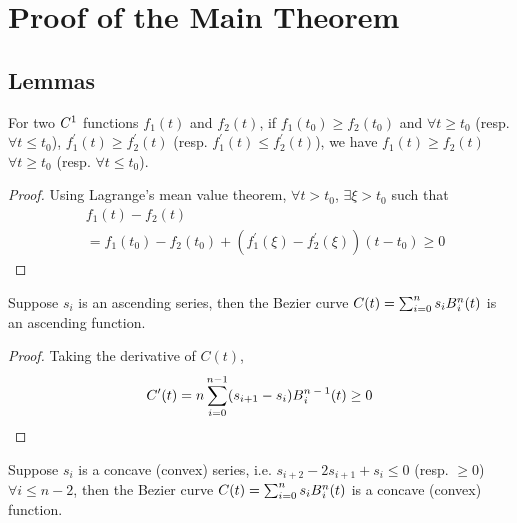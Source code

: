 \section{Proof of the Main Theorem} \label{Proof}

\subsection{Lemmas}

\begin{lemma}
For two $C\textsupsub{$1$}{}$ functions $f_{1}(t)$ and $f_{2}(t)$, if  $f_{1}(t_{0}) \geq f_{2}(t_{0})$ and $\forall t \geq t_{0}$ (resp. $\forall t \leq t_{0}$), 
$f_{1}^{\prime}(t) \geq f_{2}^{\prime}(t)$ (resp. $f_{1}^{\prime}(t) \leq f_{2}^{\prime}(t)$), we have $f_{1}(t) \geq f_{2}(t)$ $\forall t \geq t_{0}$ (resp. $\forall t \leq t_{0}$).
\label{lemma:simpleAscending}
\end{lemma}

\begin{proof}
Using Lagrange’s mean value theorem, $\forall t > t_{0}$,
$\exists \xi > t_{0}$ such that
\begin{equation}\begin{split}
&f_{1}(t)-f_{2}(t) \\
&=f_{1}(t_{0})-f_{2}(t_{0}) + (f_{1}^{\prime}(\xi)-f_{2}^{\prime}(\xi))(t-t_{0}) \ge 0
\label{eq.1}
\end{split}\end{equation}%
\end{proof}

\begin{lemma}
Suppose $s_{i}$ is an ascending series, then the Bezier curve $C(t)=\sum_{i=0}^{n}s_{i}B\textsupsub{$n$}{$i$}(t)$ is an ascending function.
\label{lemma:bezierAscending}
\end{lemma}

\begin{proof}
Taking the derivative of $C(t)$,
\begin{equation}\begin{split}
C^{\prime}(t)=n\sum_{i=0}^{n-1}(s_{i+1}-s_{i})B\textsupsub{$n-1$}{$i$}(t) \ge 0
\end{split}\end{equation}
\end{proof}

\begin{lemma}
Suppose $s_{i}$ is a concave (convex) series, i.e. $s_{i+2}-2s_{i+1}+s_{i} \le 0$ (resp. $\ge 0$) $\forall i \le n-2$,  then the Bezier curve $C(t)=\sum_{i=0}^{n}s_{i}B\textsupsub{$n$}{$i$}(t)$ is a concave (convex) function.
\label{lemma:bezierConcave}
\end{lemma}

